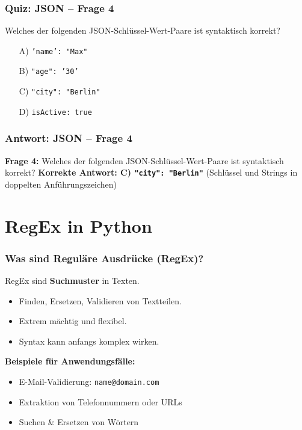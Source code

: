 \documentclass[aspectratio=169]{beamer} %
\begin{document}
\begin{frame}[fragile]
\frametitle{Quiz: JSON – Frage 4}
Welches der folgenden JSON-Schlüssel-Wert-Paare ist syntaktisch korrekt?
\begin{enumerate}
    \item[A)] \texttt{'name': "Max"}
    \item[B)] \texttt{"age": '30'}
    \item[C)] \texttt{"city": "Berlin"}
    \item[D)] \texttt{isActive: true}
\end{enumerate}
\end{frame}

\begin{frame}[fragile]
\frametitle{Antwort: JSON – Frage 4}
\textbf{Frage 4:} Welches der folgenden JSON-Schlüssel-Wert-Paare ist syntaktisch korrekt?
\vspace{1em}
\textbf{Korrekte Antwort: C) \texttt{"city": "Berlin"}} (Schlüssel und Strings in doppelten Anführungszeichen)
\end{frame}


\section{RegEx in Python}

\begin{frame}[fragile]
\frametitle{Was sind Reguläre Ausdrücke (RegEx)?}
RegEx sind \textbf{Suchmuster} in Texten.
\begin{itemize}
    \item Finden, Ersetzen, Validieren von Textteilen.
    \item Extrem mächtig und flexibel.
    \item Syntax kann anfangs komplex wirken.
\end{itemize}
\textbf{Beispiele für Anwendungsfälle:}
\begin{itemize}
    \item E-Mail-Validierung: \texttt{name@domain.com}
    \item Extraktion von Telefonnummern oder URLs
    \item Suchen \& Ersetzen von Wörtern
\end{itemize}
\end{frame}
\end{document}

